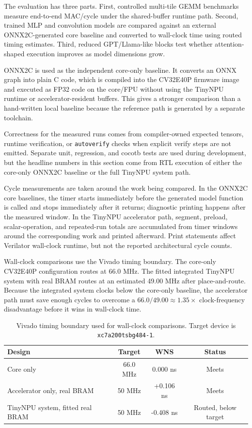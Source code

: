 \documentclass[a4paper, 12pt, titlepage]{article}
\begin{document}
The evaluation has three parts. First, controlled multi-tile GEMM benchmarks measure end-to-end MAC/cycle under the shared-buffer runtime path. Second, trained MLP and convolution models are compared against an external ONNX2C-generated core baseline and converted to wall-clock time using routed timing estimates. Third, reduced GPT/Llama-like blocks test whether attention-shaped execution improves as model dimensions grow.

ONNX2C is used as the independent core-only baseline. It converts an ONNX graph into plain C code, which is compiled into the CV32E40P firmware image and executed as FP32 code on the core/FPU without using the TinyNPU runtime or accelerator-resident buffers. This gives a stronger comparison than a hand-written local baseline because the reference path is generated by a separate toolchain.

Correctness for the measured runs comes from compiler-owned expected tensors, runtime verification, or \texttt{autoverify} checks when explicit verify steps are not emitted. Separate unit, regression, and cocotb tests are used during development, but the headline numbers in this section come from RTL execution of either the core-only ONNX2C baseline or the full TinyNPU system path.

Cycle measurements are taken around the work being compared. In the ONNX2C core baselines, the timer starts immediately before the generated model function is called and stops immediately after it returns; diagnostic printing happens after the measured window. In the TinyNPU accelerator path, segment, preload, scalar-operation, and repeated-run totals are accumulated from timer windows around the corresponding work and printed afterward. Print statements affect Verilator wall-clock runtime, but not the reported architectural cycle counts.

Wall-clock comparisons use the Vivado timing boundary. The core-only CV32E40P configuration routes at 66.0 MHz. The fitted integrated TinyNPU system with real BRAM routes at an estimated 49.00 MHz after place-and-route. Because the integrated system clocks below the core-only baseline, the accelerator path must save enough cycles to overcome a \(66.0/49.00 \approx 1.35\times\) clock-frequency disadvantage before it wins in wall-clock time.

\begin{table}[H]
    \centering
    \footnotesize
    \caption{Vivado timing boundary used for wall-clock comparisons. Target device is \texttt{xc7a200tsbg484-1}.}
    \label{tab:vivado-timing}
    \begin{tabularx}{\textwidth}{|Y|c|c|c|}
        \hline
        \textbf{Design} & \textbf{Target} & \textbf{WNS} & \textbf{Status} \\
        \hline
        Core only & 66.0 MHz & 0.000 ns & Meets \\
        \hline
        Accelerator only, real BRAM & 50 MHz & +0.106 ns & Meets \\
        \hline
        TinyNPU system, fitted real BRAM & 50 MHz & -0.408 ns & Routed, below target \\
        \hline
    \end{tabularx}
\end{table}
\end{document}
